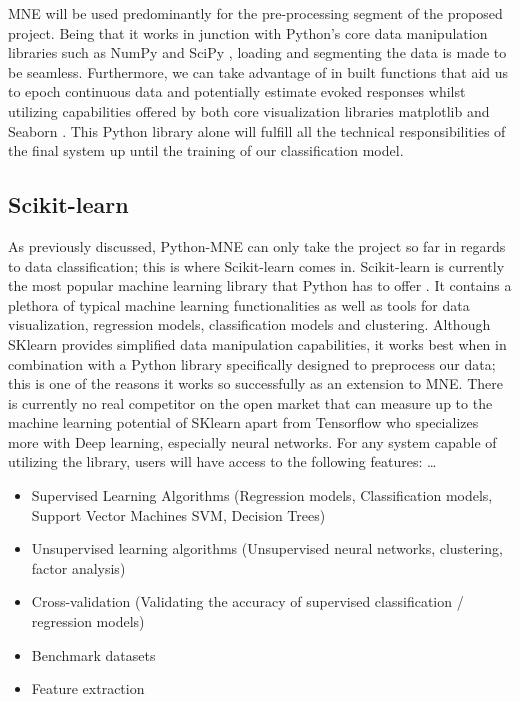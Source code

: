 \documentclass[12pt]{article}
\begin{document}
MNE will be used predominantly for the pre-processing segment of the proposed project. Being that it works in junction with Python's core data manipulation libraries such as NumPy \cite{harris2020array} and SciPy \cite{2020SciPy-NMeth}, loading and segmenting the data is made to be seamless. Furthermore, we can take advantage of in built functions that aid us to epoch continuous data and potentially estimate evoked responses whilst utilizing capabilities offered by both core visualization libraries matplotlib \cite{Hunter:2007} and Seaborn \cite{michael_waskom_2017_883859}. This Python library alone will fulfill all the technical responsibilities of the final system up until the training of our classification model.

\subsection{Scikit-learn}
As previously discussed, Python-MNE can only take the project so far in regards to data classification; this is where Scikit-learn comes in. Scikit-learn is currently the most popular machine learning library that Python has to offer \cite{scikit-learn}. It contains a plethora of typical machine learning functionalities as well as tools for data visualization, regression models, classification models and clustering. Although SKlearn provides simplified data manipulation capabilities, it works best when in combination with a Python library specifically designed to preprocess our data; this is one of the reasons it works so successfully as an extension to MNE. There is currently no real competitor on the open market that can measure up to the machine learning potential of SKlearn apart from Tensorflow \cite{tensorflow2015-whitepaper} who specializes more with Deep learning, especially neural networks. For any system capable of utilizing the library, users will have access to the following features:
\dots
\begin{itemize}
\item Supervised Learning Algorithms (Regression models, Classification models, Support Vector Machines SVM, Decision Trees)
\item Unsupervised learning algorithms (Unsupervised neural networks, clustering, factor analysis)
\item Cross-validation (Validating the accuracy of supervised classification / regression models)
\item Benchmark datasets
\item Feature extraction 
\end{itemize}
\end{document}

